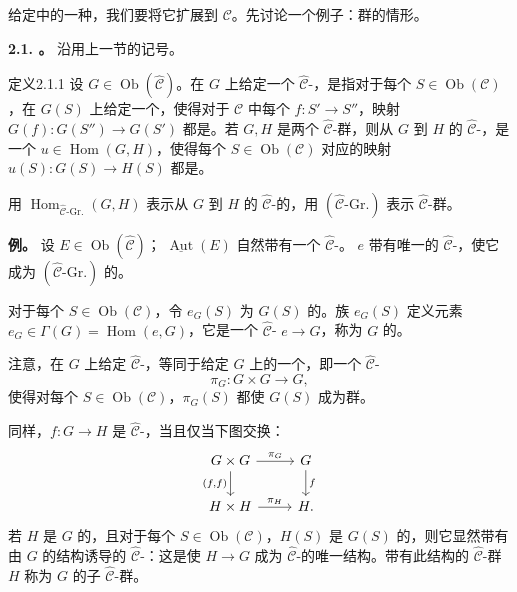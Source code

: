 给定中的一种，我们要将它扩展到 $\mathcal C$。先讨论一个例子：群的情形。

\textbf{2.1. 。} 沿用上一节的记号。
\begin{SGAresult}{定义}{2.1.1}
设 $G\in\operatorname{Ob}(\widehat{\mathcal C})$。在 $G$ 上给定一个 $\widehat{\mathcal C}$-，是指对于每个 $S\in\operatorname{Ob}(\mathcal C)$，在 $G(S)$ 上给定一个，使得对于 $\mathcal C$ 中每个 $f:S'\to S''$，映射 $G(f):G(S'')\to G(S')$ 都是。若 $G,H$ 是两个 $\widehat{\mathcal C}$-群，则从 $G$ 到 $H$ 的 $\widehat{\mathcal C}$-，是一个 $u\in\operatorname{Hom}(G,H)$，使得每个 $S\in\operatorname{Ob}(\mathcal C)$ 对应的映射 $u(S):G(S)\to H(S)$ 都是。
\end{SGAresult}
用 $\operatorname{Hom}_{\widehat{\mathcal C}\text{-}\mathrm{Gr.}}(G,H)$ 表示从 $G$ 到 $H$ 的 $\widehat{\mathcal C}$-的，用 $(\widehat{\mathcal C}\text{-}\mathrm{Gr.})$ 表示 $\widehat{\mathcal C}$-群。

\textbf{例。} 设 $E\in\operatorname{Ob}(\widehat{\mathcal C})$； $\underline{\operatorname{Aut}}(E)$ 自然带有一个 $\widehat{\mathcal C}$-。 $e$ 带有唯一的 $\widehat{\mathcal C}$-，使它成为 $(\widehat{\mathcal C}\text{-}\mathrm{Gr.})$ 的。

对于每个 $S\in\operatorname{Ob}(\mathcal C)$，令 $e_G(S)$ 为 $G(S)$ 的。族 $e_G(S)$ 定义元素 $e_G\in\Gamma(G)=\operatorname{Hom}(e,G)$，它是一个 $\widehat{\mathcal C}$-
$e\to G$，称为 $G$ 的。

注意，在 $G$ 上给定 $\widehat{\mathcal C}$-，等同于给定 $G$ 上的一个，即一个 $\widehat{\mathcal C}$-
\[
\pi_G:G\times G\longrightarrow G,
\]
使得对每个 $S\in\operatorname{Ob}(\mathcal C)$，$\pi_G(S)$ 都使 $G(S)$ 成为群。

同样，$f:G\to H$ 是 $\widehat{\mathcal C}$-，当且仅当下图交换：
\[
\begin{tikzcd}
G\times G\arrow[r,"\pi_G"]\arrow[d,"{(f,f)}"']&G\arrow[d,"f"]\\
H\times H\arrow[r,"\pi_H"]&H.
\end{tikzcd}
\]
若 $H$ 是 $G$ 的，且对于每个 $S\in\operatorname{Ob}(\mathcal C)$，$H(S)$ 是 $G(S)$ 的，则它显然带有由 $G$ 的结构诱导的 $\widehat{\mathcal C}$-：这是使 $H\to G$ 成为 $\widehat{\mathcal C}$-的唯一结构。带有此结构的 $\widehat{\mathcal C}$-群 $H$ 称为 $G$ 的子 $\widehat{\mathcal C}$-群。

